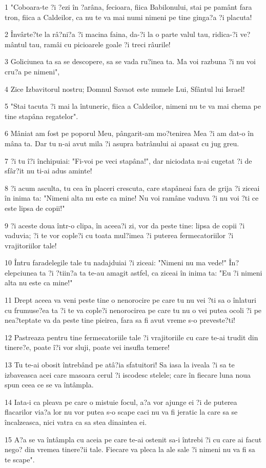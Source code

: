 \par 1 "Coboara-te ?i ?ezi în ?arâna, fecioara, fiica Babilonului, stai pe pamânt fara tron, fiica a Caldeilor, ca nu te va mai numi nimeni pe tine ginga?a ?i placuta!
\par 2 Învârte?te la râ?ni?a ?i macina faina, da-?i la o parte valul tau, ridica-?i ve?mântul tau, ramâi cu picioarele goale ?i treci râurile!
\par 3 Goliciunea ta sa se descopere, sa se vada ru?inea ta. Ma voi razbuna ?i nu voi cru?a pe nimeni",
\par 4 Zice Izbavitorul nostru; Domnul Savaot este numele Lui, Sfântul lui Israel!
\par 5 "Stai tacuta ?i mai la întuneric, fiica a Caldeilor, nimeni nu te va mai chema pe tine stapâna regatelor".
\par 6 Mâniat am fost pe poporul Meu, pângarit-am mo?tenirea Mea ?i am dat-o în mâna ta. Dar tu n-ai avut mila ?i asupra batrânului ai apasat cu jug greu.
\par 7 ?i tu î?i închipuiai: "Fi-voi pe veci stapâna!", dar niciodata n-ai cugetat ?i de sfâr?it nu ti-ai adus aminte!
\par 8 ?i acum asculta, tu cea în placeri crescuta, care stapâneai fara de grija ?i ziceai în inima ta: "Nimeni alta nu este ca mine! Nu voi ramâne vaduva ?i nu voi ?ti ce este lipsa de copii!"
\par 9 ?i aceste doua într-o clipa, în aceea?i zi, vor da peste tine: lipsa de copii ?i vaduvia; ?i te vor cople?i cu toata mul?imea ?i puterea fermecatoriilor ?i vrajitoriilor tale!
\par 10 Întru faradelegile tale tu nadajduiai ?i ziceai: "Nimeni nu ma vede!" În?elepciunea ta ?i ?tiin?a ta te-au amagit astfel, ca ziceai în inima ta: "Eu ?i nimeni alta nu este ca mine!"
\par 11 Drept aceea va veni peste tine o nenorocire pe care tu nu vei ?ti sa o înlaturi cu frumuse?ea ta ?i te va cople?i nenorocirea pe care tu nu o vei putea ocoli ?i pe nea?teptate va da peste tine pieirea, fara sa fi avut vreme s-o preveste?ti!
\par 12 Pastreaza pentru tine fermecatoriile tale ?i vrajitoriile cu care te-ai trudit din tinere?e, poate î?i vor sluji, poate vei insufla temere!
\par 13 Tu te-ai obosit întrebând pe atâ?ia sfatuitori! Sa iasa la iveala ?i sa te izbaveasca acei care masoara cerul ?i iscodesc stelele; care în fiecare luna noua spun ceea ce se va întâmpla.
\par 14 Iata-i ca pleava pe care o mistuie focul, a?a vor ajunge ei ?i de puterea flacarilor via?a lor nu vor putea s-o scape caci nu va fi jeratic la care sa se încalzeasca, nici vatra ca sa stea dinaintea ei.
\par 15 A?a se va întâmpla cu aceia pe care te-ai ostenit sa-i întrebi ?i cu care ai facut nego? din vremea tinere?ii tale. Fiecare va pleca la ale sale ?i nimeni nu va fi sa te scape".

